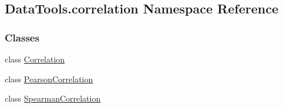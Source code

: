 \hypertarget{namespaceDataTools_1_1correlation}{}\subsection{Data\+Tools.\+correlation Namespace Reference}
\label{namespaceDataTools_1_1correlation}
\subsubsection*{Classes}
\begin{DoxyCompactItemize}
\item 
class \hyperlink{classDataTools_1_1correlation_1_1Correlation}{Correlation}
\item 
class \hyperlink{classDataTools_1_1correlation_1_1PearsonCorrelation}{Pearson\+Correlation}
\item 
class \hyperlink{classDataTools_1_1correlation_1_1SpearmanCorrelation}{Spearman\+Correlation}
\end{DoxyCompactItemize}
